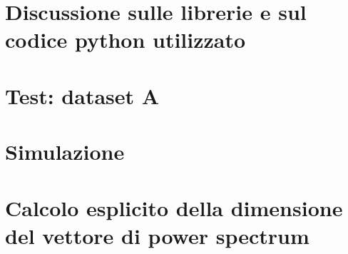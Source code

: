 \documentclass[a4paper,11pt,openany]{book}
\begin{document}
    
    
    
    

    \chapter[Python]{Discussione sulle librerie e sul codice python utilizzato}
    

    \chapter{Test: dataset A}
    
    
    \chapter{Simulazione}
    

\appendix %

    \chapter[Dimensione del vettore di power spectrum]{Calcolo esplicito della dimensione del vettore di power spectrum}
    

\backmatter %
    
   \printbibliography
    
\end{document}
